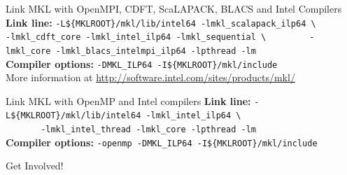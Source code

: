 \documentclass[final,t]{beamer}
\begin{document}
\begin{frame}[fragile]{}
\begin{columns}[t]
\begin{column}{.32\linewidth}
      \begin{block}{Link MKL with OpenMPI, CDFT, ScaLAPACK, BLACS and Intel Compilers}
      \textbf{Link line:} \verb|-L${MKLROOT}/mkl/lib/intel64 -lmkl_scalapack_ilp64 \|
      \verb|        -lmkl_cdft_core -lmkl_intel_ilp64 -lmkl_sequential \|
      \verb|        -lmkl_core -lmkl_blacs_intelmpi_ilp64 -lpthread -lm|\\
      \textbf{Compiler options: }      \verb|-DMKL_ILP64 -I${MKLROOT}/mkl/include|\\
      More information at \url{http://software.intel.com/sites/products/mkl/}
      \end{block}
 
 
      \begin{block}{Link MKL with OpenMP and Intel compilers}
      \textbf{Link line:} \verb|-L${MKLROOT}/mkl/lib/intel64 -lmkl_intel_ilp64 \|\\
      \verb|       -lmkl_intel_thread -lmkl_core -lpthread -lm|\\
      \textbf{Compiler options: } \verb|-openmp -DMKL_ILP64 -I${MKLROOT}/mkl/include|
      \end{block}
 
 
      \begin{block}{Get Involved!}
      \end{block}
 

\end{column}
\end{columns}
\end{frame}
\end{document}
